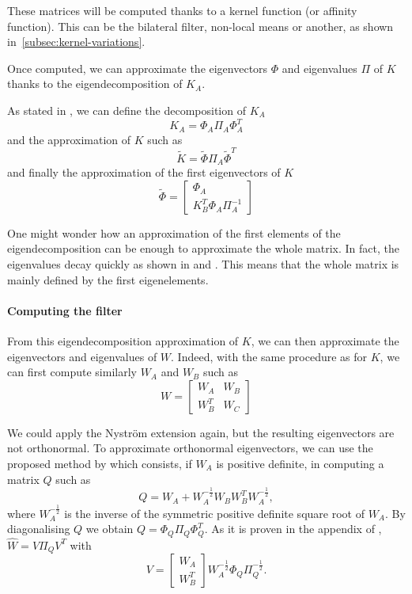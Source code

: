 These matrices will be computed thanks to a kernel function (or affinity function). This can be the bilateral filter, non-local means or another, as shown in~\ref{subsec:kernel-variations}.

Once computed, we can approximate the eigenvectors \(\Phi\) and eigenvalues \(\Pi\) of \(K\) thanks to the eigendecomposition of \(K_A\).

As stated in \cite{glide_2014}, we can define the decomposition of \(K_A\)
\[K_A = \Phi_A \Pi_A \Phi_A^T\]
and the approximation of \(K\) such as
\[\tilde{K} = \tilde{\Phi} \Pi_A \tilde{\Phi}^T\]
and finally the approximation of the first eigenvectors of \(K\)
\[
 \tilde{\Phi} = \begin{bmatrix}
  \Phi_A \\
  K_B^T \Phi_A \Pi_A^{-1}
 \end{bmatrix}
\]

One might wonder how an approximation of the first elements of the eigendecomposition can be enough to approximate the whole matrix.
In fact, the eigenvalues decay quickly as shown in \cite{siam_slides_2016} and \cite{meyer_perturbation_2014}.
This means that the whole matrix is mainly defined by the first eigenelements.

\paragraph{Computing the filter}
From this eigendecomposition approximation of \(K\), we can then approximate the eigenvectors and eigenvalues of \(W\).
Indeed, with the same procedure as for \(K\), we can first compute similarly \(W_A\) and \(W_B\) such as
\[
 W = \begin{bmatrix}
  W_A & W_B \\
  W_B^T & W_C
 \end{bmatrix}
\]

We could apply the Nystr\"om extension again, but the resulting eigenvectors are not orthonormal.
To approximate orthonormal eigenvectors, we can use the proposed method by \cite{fowlkes_spectral_2004} which consists, if \(W_A\) is positive definite, in computing a matrix \(Q\) such as
\[Q = W_A + W_A^{-\frac{1}{2}} W_B W_B^T W_A^{-\frac{1}{2}},\]
where \(W_A^{-\frac{1}{2}}\) is the inverse of the symmetric positive definite square root of \(W_A\).
By diagonalising \(Q\) we obtain \(Q = \Phi_Q \Pi_Q \Phi_Q^T\).
As it is proven in the appendix of \cite{fowlkes_spectral_2004}, \(\hat{W} = V\Pi_QV^T\) with
\[
 V = \begin{bmatrix}
  W_A \\
  W_B^T
 \end{bmatrix}
 W_A^{-\frac{1}{2}} \Phi_Q \Pi_Q^{-\frac{1}{2}}.
\]

